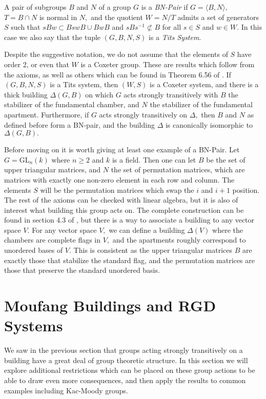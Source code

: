 \documentclass[class=book, crop=false,12 pt]{standalone}
\begin{document}
\begin{defn}
	\label{defn:bnpair}
	A pair of subgroups $B$ and $N$ of a group $G$ is a \emph{BN-Pair} if $G=\langle B,N\rangle,$ $T=B\cap N$ is normal in $N,$ and the quotient $W=N/T$ admits a set of generators $S$ such that $sBw\subset BswB\cup BwB$ and $sBs^{-1}\not\subset B$ for all $s\in S$ and $w\in W.$ In this case we also say that the tuple $(G,B,N,S)$ is a \emph{Tits System}.
\end{defn}

Despite the suggestive notation, we do not assume that the elements of $S$ have order 2, or even that $W$ is a Coxeter group. These are results which follow from the axioms, as well as others which can be found in Theorem 6.56 of \cite{buildings}. If $(G,B,N,S)$ is a Tits system, then $(W,S)$ is a Coxeter system, and there is a thick building $\Delta(G,B)$ on which $G$ acts strongly transitively with $B$ the stabilizer of the fundamental chamber, and $N$ the stabilizer of the fundamental apartment. Furthermore, if $G$ acts strongly transitively on $\Delta,$ then $B$ and $N$ as defined before form a BN-pair, and the building $\Delta$ is canonically isomorphic to $\Delta(G,B).$

Before moving on it is worth giving at least one example of a BN-Pair. Let $G=\mathrm{GL}_n(k)$ where $n\ge 2$ and $k$ is a field. Then one can let $B$ be the set of upper triangular matrices, and $N$ the set of permutation matrices, which are matrices with exactly one non-zero element in each row and column. The elements $S$ will be the permutation matrices which swap the $i$ and $i+1$ position. The rest of the axioms can be checked with linear algebra, but it is also of interest what building this group acts on. The complete construction can be found in section 4.3 of \cite{buildings}, but there is a way to associate a building to any vector space $V.$ For any vector space $V,$ we can define a building $\Delta(V)$ where the chambers are complete flags in $V,$ and the apartments roughly correspond to unordered bases of $V.$ This is consistent as the upper triangular matrices $B$ are exactly those that stabilize the standard flag, and the permutation matrices are those that preserve the standard unordered basis.

\section{Moufang Buildings and RGD Systems}
We saw in the previous section that groups acting strongly transitively on a building have a great deal of group theoretic structure. In this section we will explore additional restrictions which can be placed on these group actions to be able to draw even more consequences, and then apply the results to common examples including Kac-Moody groups.
\end{document}
